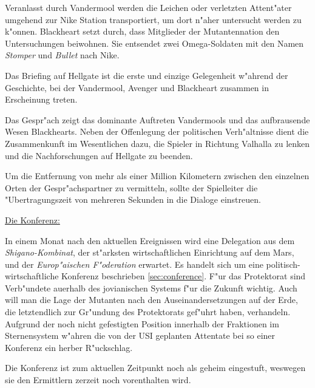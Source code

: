 Veranlasst durch Vandermool werden die Leichen oder verletzten Attent"ater umgehend zur Nike Station transportiert, um dort n"aher untersucht werden zu k"onnen. Blackheart setzt durch, dass Mitglieder der Mutantennation den Untersuchungen beiwohnen. Sie entsendet zwei Omega-Soldaten mit den Namen \emph{Stomper} und \emph{Bullet} nach Nike.

\begin{remarks}
	Das Briefing auf Hellgate ist die erste und einzige Gelegenheit w"ahrend der Geschichte, bei der Vandermool, Avenger und Blackheart zusammen in Erscheinung treten.


	Das Gespr"ach zeigt das dominante Auftreten Vandermools und das aufbrausende Wesen Blackhearts. Neben der Offenlegung der politischen Verh"altnisse dient die Zusammenkunft im Wesentlichen dazu, die Spieler in Richtung Valhalla zu lenken und die Nachforschungen auf Hellgate zu beenden.

	Um die Entfernung von mehr als einer Million Kilometern zwischen den einzelnen Orten der Gespr"achspartner zu vermitteln, sollte der Spielleiter die "Ubertragungszeit von mehreren Sekunden in die Dialoge einstreuen.

	\underline{Die Konferenz:}

	In einem Monat nach den aktuellen Ereignissen wird eine Delegation aus dem \emph{Shigano-Kombinat}, der st"arksten wirtschaftlichen Einrichtung auf dem Mars, und der \emph{Europ"aischen F"oderation} erwartet.  Es handelt sich um eine 
	politisch-wirtschaftliche Konferenz beschrieben \cref{sec:conference}. F"ur das Protektorat sind Verb"undete au\3erhalb des jovianischen Systems f"ur die Zukunft wichtig. Auch will man die Lage der Mutanten nach den Auseinandersetzungen auf der Erde, die letztendlich zur Gr"undung des Protektorats gef"uhrt haben, verhandeln. Aufgrund der noch nicht gefestigten Position innerhalb der Fraktionen im Sternensystem w"ahren die von der USI geplanten Attentate bei so einer Konferenz ein herber R"uckschlag.
	
	Die Konferenz ist zum aktuellen Zeitpunkt noch als geheim eingestuft, weswegen sie den Ermittlern zerzeit noch vorenthalten wird.
\end{remarks}
